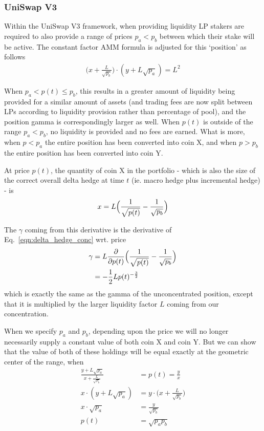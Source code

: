 \documentclass{article}
\begin{document}
\subsubsection*{UniSwap V3}

Within the UniSwap V3 framework, when providing liquidity LP stakers are required to also provide a range of prices $p_a < p_b$ between which their stake will be active. The constant factor AMM formula is adjusted for this `position' as follows
\begin{align}
\bigl( x + {\frac L {\sqrt{p_b}}} \bigr) \cdot ( y + L \sqrt{p_a} ) = L^2
\label{eqn:conc_liquidity}
\end{align}

When $p_a < p(t) \leq p_b$, this results in a greater amount of liquidity being provided for a similar amount of assets (and trading fees are now split between LPs according to liquidity provision rather than percentage of pool), and the position gamma is correspondingly larger as well. When $p(t)$ is outside of the range $p_a < p_b$, no liquidity is provided and no fees are earned. What is more, when $p < p_a$ the entire position has been converted into coin X, and when $p > p_b$ the entire position has been converted into coin Y.

At price $p(t)$, the quantity of coin X in the portfolio - which is also the size of the correct overall delta hedge at time $t$ (ie. macro hedge plus incremental hedge) - is
\begin{align}
x = L \Bigl( {\frac 1 {\sqrt{p(t)}}} - {\frac 1 {\sqrt{p_b}}} \Bigr)
\label{eqn:delta_hedge_conc}
\end{align}

The $\gamma$ coming from this derivative is the derivative of Eq.~\ref{eqn:delta_hedge_conc} wrt. price
\begin{align}
\gamma &= L {\frac {\partial} {\partial p(t)}} \Bigl( {\frac 1 {\sqrt{p(t)}}} - {\frac 1 {\sqrt{p_b}}} \Bigr) \\
&= -{\frac 1 2} L p(t)^{-{\frac 3 2}}
\label{eqn:gamma_conc}
\end{align}
which is exactly the same as the gamma of the unconcentrated position, except that it is multiplied by the larger liquidity factor $L$ coming from our concentration.

When we specify $p_a$ and $p_b$, depending upon the price we will no longer necessarily supply a constant value of both coin X and coin Y. But we can show that the value of both of these holdings will be equal exactly at the geometric center of the range, when
\begin{align*}
{\frac {y + L \sqrt{p_a}} {x + {\frac L {\sqrt{p_b}}}} } &= p(t) = {\frac y x} \\
x \cdot ( y + L \sqrt{p_a} ) &= y \cdot \bigl( x + {\frac L {\sqrt{p_b}}} \bigr) \\
x \cdot \sqrt{p_a} &= {\frac y {\sqrt{p_b}}} \\
p(t) &= \sqrt{p_a p_b}
\label{eqn:geometric_center}
\end{align*}
\end{document}
